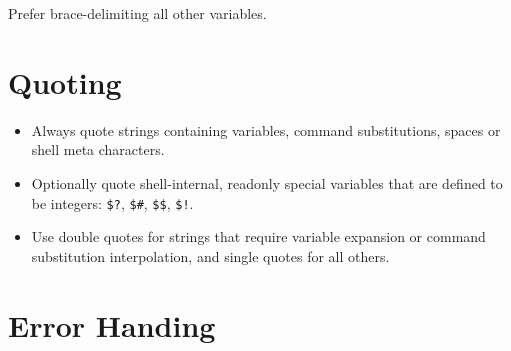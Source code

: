 \documentclass[
]{book}
\newenvironment{Shaded}{\begin{snugshade}}{\end{snugshade}}
\newcommand{\BuiltInTok}[1]{#1}
\newcommand{\CommentTok}[1]{\textcolor[rgb]{0.56,0.35,0.01}{\textit{#1}}}
\newcommand{\DataTypeTok}[1]{\textcolor[rgb]{0.13,0.29,0.53}{#1}}
\newcommand{\ExtensionTok}[1]{#1}
\newcommand{\StringTok}[1]{\textcolor[rgb]{0.31,0.60,0.02}{#1}}
\newcommand{\VariableTok}[1]{\textcolor[rgb]{0.00,0.00,0.00}{#1}}
\begin{document}
Prefer brace-delimiting all other variables.

\hypertarget{quoting}{%
\section{Quoting}\label{quoting}}

\begin{itemize}
\item
  Always quote strings containing variables, command substitutions, spaces or
  shell meta characters.
\item
  Optionally quote shell-internal, readonly special variables that are defined
  to be integers: \texttt{\$?}, \texttt{\$\#}, \texttt{\$\$}, \texttt{\$!}.
\item
  Use double quotes for strings that require variable expansion or command
  substitution interpolation, and single quotes for all others.

\begin{Shaded}
\end{Shaded}
\end{itemize}

\hypertarget{error-handing}{%
\section{Error Handing}\label{error-handing}}
\end{document}
